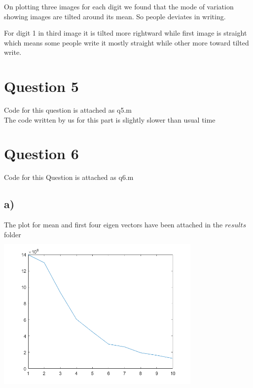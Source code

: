 \documentclass{article}
\begin{document}
On plotting three images for each digit we found that the mode of variation showing images  are tilted around its mean. So people deviates in writing. 

For digit 1 in third image it is tilted more rightward while first image is straight which means some people write it mostly straight while other more toward tilted write.

\section*{Question 5}
Code for this question is attached as q5.m\\
The code written by us for this part is slightly slower than usual time\\
\section*{Question 6}
Code for this Question is attached as q6.m
\subsection*{a)}
The plot for mean and first four eigen vectors have been attached in the $results$ folder\\
    {\includegraphics[width =10cm, height=8cm]{hw4/q6_eigenvalues.png}}\\
\end{document}
